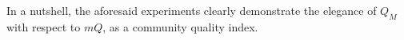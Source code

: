 
In a nutshell, the aforesaid experiments clearly demonstrate the elegance of $Q_M$ with respect to $mQ$, as a community quality index.







